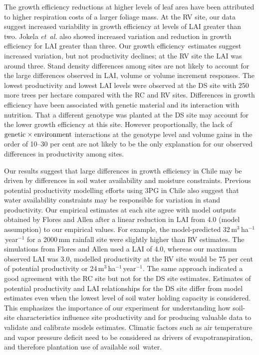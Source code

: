 \documentclass[final]{foresj}
\begin{document}
The growth efficiency reductions at higher levels of leaf
area have been attributed to higher respiration costs of a
larger foliage mass.\cite{80,87,88} At the RV site, our
data suggest increased variability in growth efficiency at
levels of LAI greater than two. Jokela \textit{et~al.}\cite{81} also
showed increased variation and reduction in growth
efficiency for LAI greater than three. Our growth
\hbox{efficiency estimates} suggest increased variation, but not
productivity declines; at the RV site the LAI was around
three. Stand density differences among sites are not likely
to account for the large differences observed in LAI,
volume or volume increment responses. The lowest
productivity and lowest LAI levels were observed at the DS
site with 250 more trees per hectare compared with the RC
and RV sites. Differences in growth efficiency have been
associated with genetic material and its interaction with
nutrition.\cite{75,80,86} That a different genotype was
planted at the DS site may account for the lower growth
efficiency at this site. However proportionally, the lack
of $\hbox{genetic} \times \hbox{environment}$ interactions
at the genotype level and volume gains in the order of
10--30 per cent are not likely to be the only explanation
for our observed differences in productivity among sites.\cite{86,89}

Our results suggest that large differences in growth
efficiency in Chile may be driven by differences in soil
water availability and moisture constraints. Previous
potential productivity modelling efforts using 3PG in
Chile\cite{21} also suggest that water availability
constraints may be responsible for variation in stand
\hbox{productivity}. Our empirical estimates at each site agree
with model outputs obtained by Flores and Allen\cite{21}
after a linear reduction in LAI from 4.0 (model assumption)
to our empirical values. For example, the model-predicted
32\,m$^{3}$\,ha$^{-1}$\,year$^{-1}$ for a 2000\,mm rainfall
site were slightly higher than RV estimates. The
simulations from Flores and Allen\cite{21} used a LAI of
4.0, whereas our maximum observed LAI was 3.0, modelled
productivity at the RV site would be 75 per cent of
potential productivity or
24\,m$^{3}$\,ha$^{-1}$\,year$^{-1}$. The same approach
indicated a good agreement with the RC site but not for the
DS site estimates. Estimates of potential productivity and
LAI relationships for the DS site differ from model
estimates even when the lowest level of soil water holding
capacity is considered. This emphasizes the importance of
our experiment for understanding how soil-site
characteristics influence site productivity and for
producing valuable data to validate and calibrate models
estimates. Climatic factors such as air temperature and
vapor pressure deficit need to be considered as drivers of
evapotranspiration,\cite{90} and therefore plantation use
of available soil~water.
\end{document}
